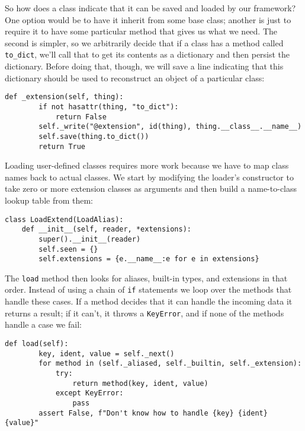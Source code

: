\documentclass{scrbook}
\begin{document}
So how does a class indicate that it can be saved and loaded by our framework?
One option would be to have it inherit from some base class;
another is just to require it to have some particular method
that gives us what we need.
The second is simpler,
so we arbitrarily decide that
if a class has a method called \texttt{to\_dict},
we'll call that to get its contents as a dictionary
and then persist the dictionary.
Before doing that,
though,
we will save a line indicating that
this dictionary should be used to reconstruct an object
of a particular class:


\begin{lstlisting}[frame=single,frameround=tttt]
    def _extension(self, thing):
        if not hasattr(thing, "to_dict"):
            return False
        self._write("@extension", id(thing), thing.__class__.__name__)
        self.save(thing.to_dict())
        return True
\end{lstlisting}



Loading user-defined classes requires more work
because we have to map class names back to actual classes.
We start by modifying the loader's constructor
to take zero or more extension classes as arguments
and then build a name-to-class lookup table from them:


\begin{lstlisting}[frame=single,frameround=tttt]
class LoadExtend(LoadAlias):
    def __init__(self, reader, *extensions):
        super().__init__(reader)
        self.seen = {}
        self.extensions = {e.__name__:e for e in extensions}
\end{lstlisting}



The \texttt{load} method then looks for aliases,
built-in types,
and extensions in that order.
Instead of using a chain of \texttt{if} statements
we loop over the methods that handle these cases.
If a method decides that it can handle the incoming data
it returns a result;
if it can't,
it throws a \texttt{KeyError},
and if none of the methods handle a case
we fail:


\begin{lstlisting}[frame=single,frameround=tttt]
    def load(self):
        key, ident, value = self._next()
        for method in (self._aliased, self._builtin, self._extension):
            try:
                return method(key, ident, value)
            except KeyError:
                pass
        assert False, f"Don't know how to handle {key} {ident} {value}"
\end{lstlisting}
\end{document}
